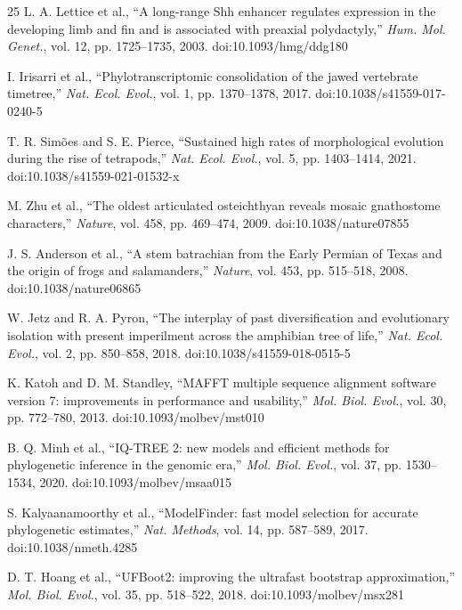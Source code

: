 \documentclass[10pt,letterpaper]{article}
\begin{document}
\begin{thebibliography}{25}
L. A. Lettice et al., ``A long-range Shh enhancer regulates expression in the developing limb and fin and is associated with preaxial polydactyly,'' \emph{Hum. Mol. Genet.}, vol. 12, pp. 1725--1735, 2003. doi:10.1093/hmg/ddg180

I. Irisarri et al., ``Phylotranscriptomic consolidation of the jawed vertebrate timetree,'' \emph{Nat. Ecol. Evol.}, vol. 1, pp. 1370--1378, 2017. doi:10.1038/s41559-017-0240-5

T. R. Sim\~oes and S. E. Pierce, ``Sustained high rates of morphological evolution during the rise of tetrapods,'' \emph{Nat. Ecol. Evol.}, vol. 5, pp. 1403--1414, 2021. doi:10.1038/s41559-021-01532-x

M. Zhu et al., ``The oldest articulated osteichthyan reveals mosaic gnathostome characters,'' \emph{Nature}, vol. 458, pp. 469--474, 2009. doi:10.1038/nature07855

J. S. Anderson et al., ``A stem batrachian from the Early Permian of Texas and the origin of frogs and salamanders,'' \emph{Nature}, vol. 453, pp. 515--518, 2008. doi:10.1038/nature06865

W. Jetz and R. A. Pyron, ``The interplay of past diversification and evolutionary isolation with present imperilment across the amphibian tree of life,'' \emph{Nat. Ecol. Evol.}, vol. 2, pp. 850--858, 2018. doi:10.1038/s41559-018-0515-5

K. Katoh and D. M. Standley, ``MAFFT multiple sequence alignment software version 7: improvements in performance and usability,'' \emph{Mol. Biol. Evol.}, vol. 30, pp. 772--780, 2013. doi:10.1093/molbev/mst010

B. Q. Minh et al., ``IQ-TREE 2: new models and efficient methods for phylogenetic inference in the genomic era,'' \emph{Mol. Biol. Evol.}, vol. 37, pp. 1530--1534, 2020. doi:10.1093/molbev/msaa015

S. Kalyaanamoorthy et al., ``ModelFinder: fast model selection for accurate phylogenetic estimates,'' \emph{Nat. Methods}, vol. 14, pp. 587--589, 2017. doi:10.1038/nmeth.4285

D. T. Hoang et al., ``UFBoot2: improving the ultrafast bootstrap approximation,'' \emph{Mol. Biol. Evol.}, vol. 35, pp. 518--522, 2018. doi:10.1093/molbev/msx281


\end{thebibliography}
\end{document}

